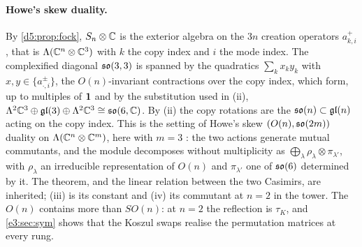 \paragraph{Howe's skew duality.} By \cref{d5:prop:fock}, $S_n\otimes\mathbb{C}$ is the exterior algebra on the $3n$ creation operators
$a^+_{k,i}$, that is $\Lambda(\mathbb{C}^n\otimes\mathbb{C}^3)$ with $k$ the copy index and $i$ the mode index. The complexified diagonal $\mathfrak{so}(3,3)$ is spanned by
the quadratics $\sum_kx_ky_k$ with $x,y\in\{a^\pm_{\cdot,i}\}$, the $O(n)$-invariant contractions over the copy index, which form, up to multiples
of $\mathbf 1$ and by the substitution used in (ii),
$\Lambda^2\mathbb{C}^3\oplus\mathfrak{gl}(3)\oplus\Lambda^2\mathbb{C}^3\cong\mathfrak{so}(6,\mathbb{C})$. By (ii) the copy rotations are the $\mathfrak{so}(n)\subset\mathfrak{gl}(n)$ acting on the copy index.
This is the setting of Howe's skew $(O(n),\mathfrak{so}(2m))$ duality on $\Lambda(\mathbb{C}^n\otimes\mathbb{C}^m)$, here with $m=3$ \cite{Howe89}: the two actions generate mutual
commutants, and the module decomposes without multiplicity as $\bigoplus_\lambda\rho_\lambda\otimes\pi_{\lambda'}$, with $\rho_\lambda$ an irreducible
representation of $O(n)$ and $\pi_{\lambda'}$ one of $\mathfrak{so}(6)$ determined by it. The theorem, and the linear relation between the two Casimirs, are
inherited; (iii) is its constant and (iv) its commutant at $n=2$ in the tower. The $O(n)$ contains more than $SO(n)$: at $n=2$ the reflection is
$\tau_K$, and \cref{e3:sec:sym} shows that the Koszul swaps realise the permutation matrices at every rung.

